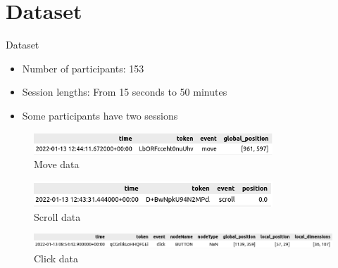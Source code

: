 \documentclass{beamer}
\begin{document}
\section{Dataset}
\begin{frame}{Dataset}
    \begin{itemize}
        \item Number of participants: 153
        \item Session lengths: From 15 seconds to 50 minutes
        \item Some participants have two sessions
    \end{itemize}
    \begin{figure}
        \centering
        \includegraphics[width=0.8\textwidth]{theme/images/move.png}
        \caption{Move data}
        \label{fig:move}
    \end{figure}
    \begin{figure}
        \centering
        \includegraphics[width=0.8\textwidth]{theme/images/scroll.png}
        \caption{Scroll data}
        \label{fig:scroll}
    \end{figure}
    \begin{figure}
        \centering
        \includegraphics[width=\textwidth]{theme/images/click.png}
        \caption{Click data}
        \label{fig:click}
    \end{figure}
\end{frame}
\end{document}
